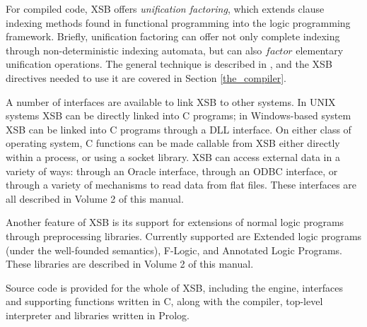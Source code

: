 For compiled code, XSB offers {\em unification factoring}, which
extends clause indexing methods found in functional programming into
the logic programming framework.  Briefly, unification factoring can
offer not only complete indexing through non-deterministic indexing
automata, but can also $factor$ elementary unification operations.
The general technique is described in \cite{DRRSSSW95}, and the XSB
directives needed to use it are covered in Section
\ref{the_compiler}.

A number of interfaces are available to link XSB to other systems.
In UNIX systems XSB can be directly linked into C programs; in
Windows-based system XSB can be linked into C programs through a DLL
interface.  On either class of operating system, C functions can be
made callable from XSB either directly within a process, or using a
socket library.  XSB can access external data in a variety of ways:
through an Oracle interface, through an ODBC interface, or through a
variety of mechanisms to read data from flat files.  These interfaces
are all described in Volume 2 of this manual. 

Another feature of XSB is its support for extensions of normal logic
programs through preprocessing libraries.  Currently supported are
Extended logic programs (under the well-founded semantics), F-Logic,
and Annotated Logic Programs.  These libraries are
described in  Volume 2 of this
manual. 

Source code is provided for the whole of XSB, including the
engine, interfaces and supporting functions written in C, along with
the compiler, top-level interpreter and libraries written in Prolog.


